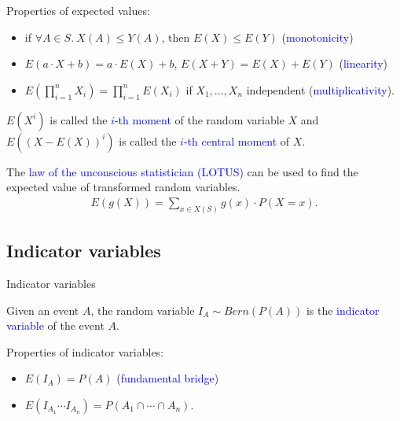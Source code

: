 \documentclass{beamer}
\def\padding{\vspace{0.5cm}}
\def\b{\textcolor{blue}}
\begin{document}
\begin{frame}
    Properties of expected values:\pause
    \begin{itemize}
        \item if $\forall A \in S.\ X(A) \leq Y(A)$, then $E(X) \leq E(Y)$ (\b{monotonicity})\pause
        \item $E(a \cdot X + b) = a \cdot E(X) + b$, $E(X + Y) = E(X) + E(Y)$ (\b{linearity})\pause
        \item $E(\prod_{i=1}^n X_i) = \prod_{i=1}^n E(X_i)$ if $X_1, \dots, X_n$ independent (\b{multiplicativity}).
    \end{itemize}
\end{frame}

\begin{frame}
    \begin{definition}
        $E(X^i)$ is called the \b{$i$-th moment} of the random variable $X$ and $E((X - E(X))^i)$ is called the \b{$i$-th central moment} of $X$.
    \end{definition}
\end{frame}

\begin{frame}
    The \b{law of the unconscious statistician (LOTUS)} can be used to find the expected value of transformed random variables.
    \begin{align*}
        E(g(X)) = \sum_{x \in X(S)} g(x) \cdot P(X = x).
    \end{align*}
\end{frame}

\subsection{Indicator variables}
\begin{frame}{Indicator variables}
    \begin{definition}
        Given an event $A$, the random variable $I_A \sim Bern(P(A))$ is the \b{indicator variable} of the event $A$.
    \end{definition}\pause\par\padding
    Properties of indicator variables:\pause
    \begin{itemize}
        \item $E(I_A) = P(A)$ (\b{fundamental bridge})\pause
        \item $E(I_{A_1} \cdots I_{A_n}) = P(A_1 \cap \cdots \cap A_n)$.
    \end{itemize}
\end{frame}
\end{document}
